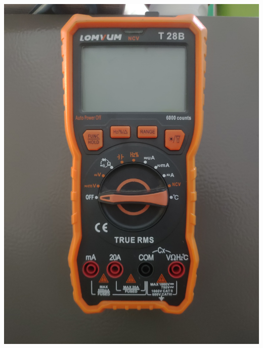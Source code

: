 \documentclass[10pt]{article}
\begin{document}
\begin{multicols}{2}
\includegraphics[width=\linewidth]{Imagenes/Multimetro.jpeg}
		
	
	


\end{multicols}
\end{document}

